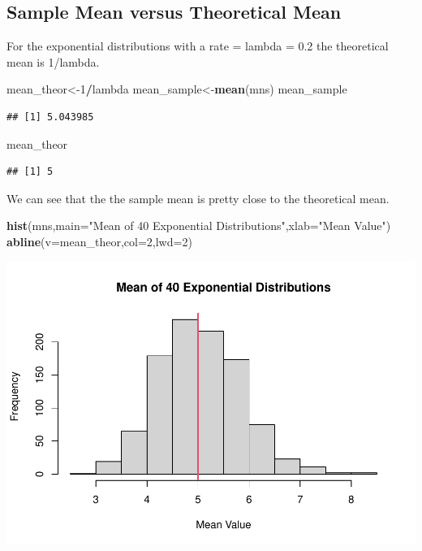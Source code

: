 \documentclass[
]{article}
\newenvironment{Shaded}{\begin{snugshade}}{\end{snugshade}}
\newcommand{\DataTypeTok}[1]{\textcolor[rgb]{0.13,0.29,0.53}{#1}}
\newcommand{\DecValTok}[1]{\textcolor[rgb]{0.00,0.00,0.81}{#1}}
\newcommand{\KeywordTok}[1]{\textcolor[rgb]{0.13,0.29,0.53}{\textbf{#1}}}
\newcommand{\NormalTok}[1]{#1}
\newcommand{\OperatorTok}[1]{\textcolor[rgb]{0.81,0.36,0.00}{\textbf{#1}}}
\newcommand{\StringTok}[1]{\textcolor[rgb]{0.31,0.60,0.02}{#1}}
\begin{document}
\hypertarget{sample-mean-versus-theoretical-mean}{%
\subsection{Sample Mean versus Theoretical
Mean}\label{sample-mean-versus-theoretical-mean}}

For the exponential distributions with a rate = lambda = 0.2 the
theoretical mean is 1/lambda.

\begin{Shaded}
\begin{Highlighting}[]
\NormalTok{mean\_theor\textless{}{-}}\DecValTok{1}\OperatorTok{/}\NormalTok{lambda}
\NormalTok{mean\_sample\textless{}{-}}\KeywordTok{mean}\NormalTok{(mns)}
\NormalTok{mean\_sample}
\end{Highlighting}
\end{Shaded}

\begin{verbatim}
## [1] 5.043985
\end{verbatim}

\begin{Shaded}
\begin{Highlighting}[]
\NormalTok{mean\_theor}
\end{Highlighting}
\end{Shaded}

\begin{verbatim}
## [1] 5
\end{verbatim}

We can see that the the sample mean is pretty close to the theoretical
mean.

\begin{Shaded}
\begin{Highlighting}[]
\KeywordTok{hist}\NormalTok{(mns,}\DataTypeTok{main=}\StringTok{"Mean of 40 Exponential Distributions"}\NormalTok{,}\DataTypeTok{xlab=}\StringTok{"Mean Value"}\NormalTok{)}
\KeywordTok{abline}\NormalTok{(}\DataTypeTok{v=}\NormalTok{mean\_theor,}\DataTypeTok{col=}\DecValTok{2}\NormalTok{,}\DataTypeTok{lwd=}\DecValTok{2}\NormalTok{)}
\end{Highlighting}
\end{Shaded}

\includegraphics{Statistical-Inference-Project_files/figure-latex/unnamed-chunk-3-1.pdf}
\end{document}

